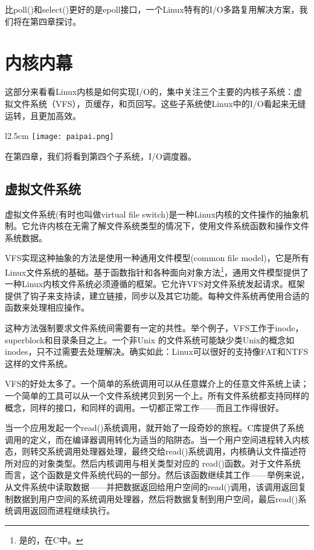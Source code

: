 比poll()和select()更好的是epoll接口，一个Linux特有的I/O多路复用解决方案，我们将在第四章探讨。

\section{内核内幕}

这部分来看看Linux内核是如何实现I/O的，集中关注三个主要的内核子系统：虚拟文件系统（VFS），页缓存，和页回写。这些子系统使Linux中的I/O看起来无缝运转，且更加高效。 

\begin{wrapfigure}{l}{2.5cm}
  \texttt{[image: paipai.png]}
\end{wrapfigure}
\mbox{}在第四章，我们将看到第四个子系统，I/O调度器。 

\subsection{虚拟文件系统}

虚拟文件系统(有时也叫做virtual file switch)是一种Linux内核的文件操作的抽象机制。它允许内核在无需了解文件系统类型的情况下，使用文件系统函数和操作文件系统数据。

VFS实现这种抽象的方法是使用一种通用文件模型(common file model)，它是所有Linux文件系统的基础。基于函数指针和各种面向对象方法\footnote[1]{是的，在C中。}，通用文件模型提供了一种Linux内核文件系统必须遵循的框架。它允许VFS对文件系统发起请求。框架提供了钩子来支持读，建立链接，同步以及其它功能。每种文件系统再使用合适的函数来处理相应操作。

这种方法强制要求文件系统间需要有一定的共性。举个例子，VFS工作于inode，superblock和目录条目之上。一个非Unix 的文件系统可能缺少类Unix的概念如inodes，只不过需要去处理解决。确实如此：Linux可以很好的支持像FAT和NTFS这样的文件系统。

VFS的好处太多了。一个简单的系统调用可以从任意媒介上的任意文件系统上读；一个简单的工具可以从一个文件系统拷贝到另一个上。所有文件系统都支持同样的概念，同样的接口，和同样的调用。一切都正常工作——而且工作得很好。

当一个应用发起一个read()系统调用，就开始了一段奇妙的旅程。C库提供了系统调用的定义，而在编译器调用转化为适当的陷阱态。当一个用户空间进程转入内核态，则转交系统调用处理器处理，最终交给read()系统调用，内核确认文件描述符所对应的对象类型。然后内核调用与相关类型对应的 read()函数。对于文件系统而言，这个函数是文件系统代码的一部分。然后该函数继续其工作——举例来说，从文件系统中读取数据——并把数据返回给用户空间的read()调用，该调用返回复制数据到用户空间的系统调用处理器，然后将数据复制到用户空间，最后read()系统调用返回而进程继续执行。

